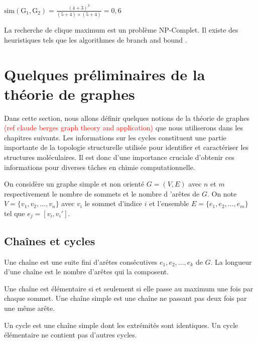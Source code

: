\begin{exemple}
\begin{itemize}
\end{itemize}
\begin{center}


 $\mathrm{sim(G_{1},G_{2}) }= \frac{(4 + 3 )^2 }{(5 + 4 )\times(5 + 4 )} = 0,6$
 \end{center}
\end{exemple}
La recherche de clique maximum est un problème NP-Complet. Il existe des heuristiques tels que les algorithmes de branch and bound \cite{rascal}.

\section{Quelques préliminaires de la théorie de graphes}
\label{theoriegraphe}
Dans cette section, nous allons définir quelques notions de la théorie de graphes \textcolor{red}{ (ref claude berges graph theory and application)} que nous utiliserons dans les chapitres suivants. Les informations sur les cycles constituent une partie importante de la topologie structurelle utilisée pour identifier et caractériser les structures moléculaires. Il est donc d’une importance cruciale d’obtenir ces informations pour diverses tâches en chimie computationnelle.

On considère un graphe simple et non orienté $G = (V, E)$ avec $n$ et $m$ respectivement le nombre de sommets et le nombre d 'arêtes de $G$. On note $V = \{v_1, v_2, ..., v_n\}$ avec $v_i$ le sommet d'indice $i$ et l'ensemble $E= \{e_1, e_2, ..., e_m\}$ tel que $e_j = [v_i, v_i']$.

\subsection{Chaînes et cycles}

\begin{definition}
Une chaîne est une suite fini d'arêtes consécutives $e_1, e_2, ...,e_k$ de $G$. La longueur d'une chaîne est le nombre d'arêtes qui la composent.
\end{definition}

Une chaîne est élémentaire si et seulement si elle passe au maximum une fois par chaque sommet. Une chaîne simple est une chaîne ne passant pas deux fois par une même arête.

\begin{definition}
Un cycle est une chaîne simple dont les extrémités sont identiques. Un cycle élémentaire ne contient pas d'autres cycles.
\end{definition}

